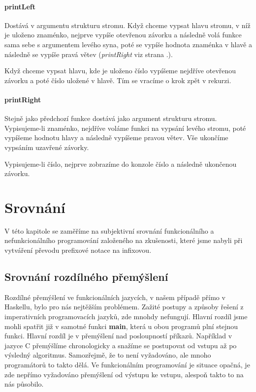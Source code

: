 \documentclass[12pt,a4paper]{report}
\begin{document}
\subsubsection{printLeft} \label{printLeft}
Dostává v argumentu strukturu stromu. Když chceme vypsat hlavu stromu, v níž je uloženo znaménko, nejprve vypíše otevřenou závorku a následně volá funkce sama sebe s argumentem levého syna, poté se vypíše hodnota znaménka v hlavě a následně se vypíše pravá větev (\textit{printRight} viz strana \pageref{printRight}.).

Když chceme vypsat hlavu, kde je uloženo číslo vypíšeme nejdříve otevřenou závorku a poté číslo uložené v hlavě. Tím se vracíme o krok zpět v rekurzi.
\newpage
\subsubsection{printRight} \label{printRight}
Stejně jako předchozí funkce dostává jako argument strukturu stromu. Vypisujeme-li znaménko, nejdříve voláme funkci na vypsání levého stromu, poté vypíšeme hodnotu hlavy a následně vypíšeme pravou větev. Vše ukončíme vypsáním uzavřené závorky.

Vypisujeme-li číslo, nejprve zobrazíme do konzole číslo a následně ukončenou závorku. 

\chapter{Srovnání}
V této kapitole se zaměříme na subjektivní srovnání funkcionálního a nefunkcionálního programování založeného na zkušenosti, které jsme nabyli při vytváření převodu prefixové notace na infixovou. 

\section{Srovnání rozdílného přemýšlení}
Rozdílné přemýšlení ve funkcionálních jazycích, v našem případě přímo v Haskellu, bylo pro nás nejtěžším problémem. Zažité postupy a způsoby řešení z imperativních programovacích jazyků, zde mnohdy nefungují. Hlavní rozdíl jsme mohli spatřit již v samotné funkci \textbf{main}, která u obou programů plní stejnou funkci. Hlavní rozdíl je v přemýšlení nad posloupností příkazů. Například v jazyce C přemýšlíme chronologicky a snažíme se postupovat od vstupu až po výsledný algoritmus. Samozřejmě, že to není vyžadováno, ale mnoho programátorů to takto dělá. Ve funkcionálním programování je situace opačná, je zde nepřímo vyžadováno přemýšlení od výstupu ke vstupu, alespoň takto to na nás působilo.  
\end{document}
